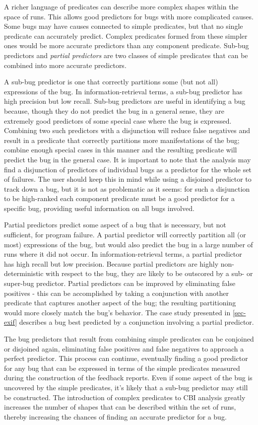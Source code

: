 A richer language of predicates can describe more complex shapes within the space of runs.  This allows good predictors for bugs with more complicated causes.  Some bugs may have causes connected to simple predicates, but that no single predicate can accurately predict.  Complex predicates formed from these simpler ones would be more accurate predictors than any component predicate.  Sub-bug predictors and \emph{partial predictors} are two classes of simple predicates that can be combined into more accurate predictors.

A sub-bug predictor is one that correctly partitions some (but not all) expressions of the bug.  In information-retrieval terms, a sub-bug predictor has high precision but low recall.  Sub-bug predictors are useful in identifying a bug because, though they do not predict the bug in a general sense, they are extremely good predictors of some special case where the bug is expressed.  Combining two such predictors with a disjunction will reduce false negatives and result in a predicate that correctly partitions more manifestations of the bug; combine enough special cases in this manner and the resulting predicate will predict the bug in the general case.  It is important to note that the analysis may find a disjunction of predictors of individual bugs as a predictor for the whole set of failures.  The user should keep this in mind while using a disjoined predictor to track down a bug, but it is not as problematic as it seems: for such a disjunction to be high-ranked each component predicate must be a good predictor for a specific bug, providing useful information on all bugs involved.

Partial predictors predict some aspect of a bug that is necessary, but not sufficient, for program failure.  A partial predictor will correctly partition all (or most) expressions of the bug, but would also predict the bug in a large number of runs where it did not occur.  In information-retrieval terms, a partial predictor has high recall but low precision.  Because partial predictors are highly non-deterministic with respect to the bug, they are likely to be outscored by a sub- or super-bug predictor.  Partial predictors can be improved by eliminating false positives - this can be accomplished by taking a conjunction with another predicate that captures another aspect of the bug; the resulting partitioning would more closely match the bug's behavior.  The case study presented in \autoref{sec-exif} describes a bug best predicted by a conjunction involving a partial predictor.

The bug predictors that result from combining simple predicates can be conjoined or disjoined again, eliminating false positives and false negatives to approach a perfect predictor.  This process can continue, eventually finding a good predictor for any bug that can be expressed in terms of the simple predicates measured during the construction of the feedback reports.  Even if some aspect of the bug is uncovered by the simple predicates, it's likely that a sub-bug predictor may still be constructed.  The introduction of complex predicates to CBI analysis greatly increases the number of shapes that can be described within the set of runs, thereby increasing the chances of finding an accurate predictor for a bug.
